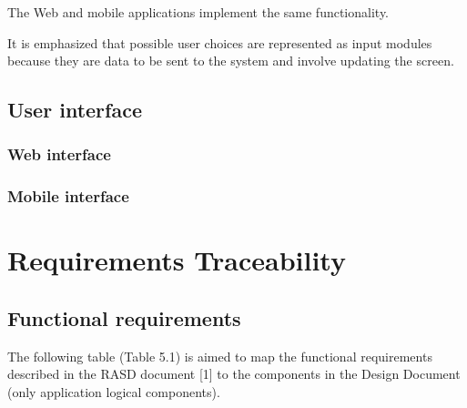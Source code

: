 \documentclass{article}
\begin{document}
 	\bigskip
	The Web and mobile applications implement the same functionality.
 	
 	\bigskip
	It is emphasized that possible user choices are represented as input modules because they are data to be sent to the system and involve updating the screen.



	\subsection{User interface}


	\subsubsection{Web interface}


	\subsubsection{Mobile interface}


	\section{Requirements Traceability}

	\subsection{Functional requirements}
	The following table (Table 5.1) is aimed to map the functional requirements described in the RASD document [1] to the components in the Design Document (only application logical components).
\end{document}
